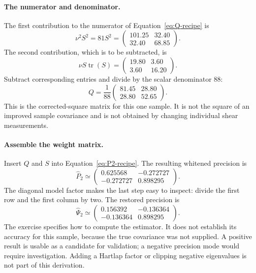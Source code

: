 \documentclass[11pt]{article}
\begin{document}
\paragraph{The numerator and denominator.}
The first contribution to the numerator of Equation~\eqref{eq:Q-recipe} is
\begin{equation}
 \nu^2S^2=81S^2=
 \begin{pmatrix}101.25&32.40\\32.40&68.85\end{pmatrix}.
\end{equation}
The second contribution, which is to be subtracted, is
\begin{equation}
 \nu S\operatorname{tr}(S)=
 \begin{pmatrix}19.80&3.60\\3.60&16.20\end{pmatrix}.
\end{equation}
Subtract corresponding entries and divide by the scalar denominator 88:
\begin{equation}
 Q=\frac1{88}
 \begin{pmatrix}81.45&28.80\\28.80&52.65\end{pmatrix}.
\end{equation}
This is the corrected-square matrix for this one sample. It is not the
square of an improved sample covariance and is not obtained by changing
individual shear measurements.

\paragraph{Assemble the weight matrix.}
Insert $Q$ and $S$ into Equation~\eqref{eq:P2-recipe}. The resulting
whitened precision is
\begin{equation}
 \widehat P_2\simeq
 \begin{pmatrix}0.625568&-0.272727\\-0.272727&0.898295\end{pmatrix}.
\end{equation}
The diagonal model factor makes the last step easy to inspect: divide the
first row and the first column by two. The restored precision is
\begin{equation}
 \widehat\Psi_2\simeq
 \begin{pmatrix}0.156392&-0.136364\\-0.136364&0.898295\end{pmatrix}.
\end{equation}
The exercise specifies how to compute the estimator. It does not establish
its accuracy for this sample, because the true covariance was not supplied.
A positive result is usable as a candidate for validation; a negative
precision mode would require investigation. Adding a Hartlap factor or
clipping negative eigenvalues is not part of this derivation.
\end{document}

